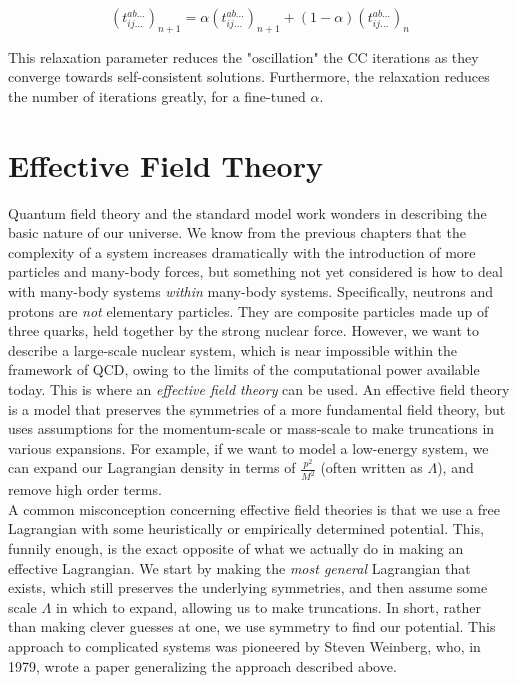 \documentclass[10pt,twoside]{report}
\begin{document}
	\begin{equation}
		(t_{ij\ldots}^{ab\ldots})_{n+1} = \alpha(t_{ij\ldots}^{ab\ldots})_{n+1} + (1-\alpha)(t_{ij\ldots}^{ab\ldots})_{n}
	\end{equation}
	
	This relaxation parameter reduces the "oscillation" the CC iterations as they converge towards self-consistent solutions. Furthermore, the relaxation reduces the number of iterations greatly, for a fine-tuned $\alpha$.
	
	\newpage
	\chapter{Effective Field Theory}
	Quantum field theory and the standard model work wonders in describing the basic nature of our universe. We know from the previous chapters that the complexity of a system increases dramatically with the introduction of more particles and many-body forces, but something not yet considered is how to deal with many-body systems \emph{within} many-body systems. Specifically, neutrons and protons are \emph{not} elementary particles. They are composite particles made up of three quarks, held together by the strong nuclear force. However, we want to describe a large-scale nuclear system, which is near impossible within the framework of QCD, owing to the limits of the computational power available today. This is where an \emph{effective field theory} can be used. An effective field theory is a model that preserves the symmetries of a more fundamental field theory, but uses assumptions for the momentum-scale or mass-scale to make truncations in various expansions. For example, if we want to model a low-energy system, we can expand our Lagrangian density in terms of $\frac{p^2}{M^2}$ (often written as $\Lambda$), and remove high order terms.\\
	
	A common misconception concerning effective field theories is that we use a free Lagrangian with some heuristically or empirically determined potential. This, funnily enough, is the exact opposite of what we actually do in making an effective Lagrangian. We start by making the \emph{most general} \cite{Weinberg79} Lagrangian that exists, which still preserves the underlying symmetries, and then assume some scale $\Lambda$ in which to expand, allowing us to make truncations. In short, rather than making clever guesses at one, we use symmetry to find our potential. This approach to complicated systems was pioneered by Steven Weinberg, who, in 1979, wrote a paper generalizing the approach described above.\\
	
\end{document}
